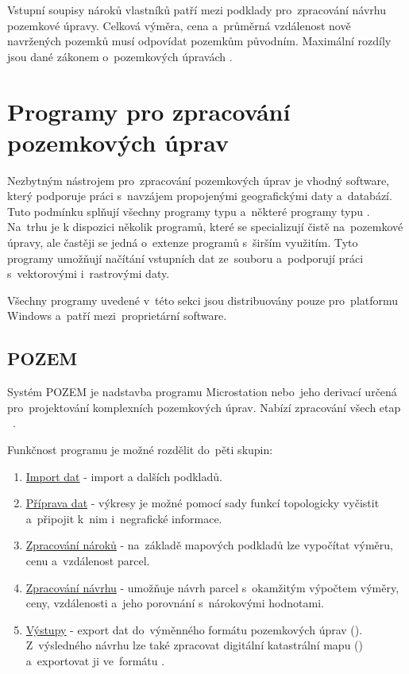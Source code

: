 Vstupní soupisy nároků vlastníků patří mezi podklady pro~zpracování návrhu pozemkové úpravy. Celková výměra, cena a~průměrná vzdálenost nově navržených pozemků musí odpovídat pozemkům původním. Maximální rozdíly jsou dané zákonem o~pozemkových úpravách \citep{pu_zakon}.

\section{Programy pro zpracování pozemkových úprav}
\label{programy_pu}

Nezbytným nástrojem pro~zpracování pozemkových úprav je vhodný software, který podporuje práci s~navzájem propojenými geografickými daty a~databází. Tuto podmínku splňují všechny programy typu  a~některé programy typu . Na~trhu je k dispozici několik programů, které se specializují čistě na~pozemkové úpravy, ale častěji se jedná o~extenze programů s~širším využitím. Tyto programy umožňují načítání vstupních dat ze~souboru  a~podporují práci s~vektorovými i~rastrovými daty.

Všechny programy uvedené v~této sekci jsou distribuovány pouze pro~platformu Windows a~patří mezi~proprietární software.

\subsection{POZEM}
\label{pozem}

Systém POZEM je nadstavba programu Microstation nebo~jeho derivací určená pro~projektování komplexních pozemkových úprav. Nabízí zpracování všech etap  \citep{pozem}~\citep{pu_skripta}.

Funkčnost programu je možné rozdělit do~pěti skupin:
	\begin{enumerate}[leftmargin=1.5cm, noitemsep]
		\item \underline{Import dat} - import  a dalších podkladů.
		\item \underline{Příprava dat} - výkresy je možné pomocí sady funkcí topologicky vyčistit a~připojit k~nim i~negrafické informace.
		\item \underline{Zpracování nároků} - na~základě mapových podkladů lze vypočítat výměru, cenu a~vzdálenost parcel. 
		\item \underline{Zpracování návrhu} - umožňuje návrh parcel s~okamžitým výpočtem výměry, ceny, vzdálenosti a~jeho porovnání s~nárokovými hodnotami.
		\item \underline{Výstupy} - export dat do~výměnného formátu pozemkových úprav (). Z~výsledného návrhu lze také zpracovat digitální katastrální mapu () a~exportovat ji ve~formátu .
	\end{enumerate}

